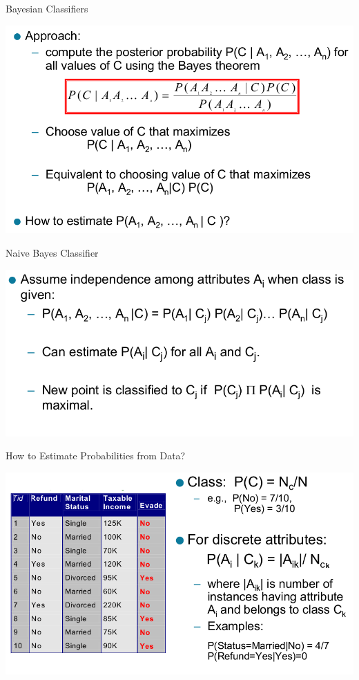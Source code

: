 \documentclass{beamer}
\begin{document}
\begin{frame}{Bayesian Classifiers}
    \begin{center}
        \includegraphics[scale=0.4]{bayesClassifier4.png}
    \end{center}
\end{frame}
\begin{frame}{Naive Bayes Classifier}
    \begin{center}
        \includegraphics[scale=0.4]{bayesClassifier5.png}
    \end{center}
\end{frame}
\begin{frame}{How to Estimate Probabilities from Data?}
    \begin{center}
        \includegraphics[scale=0.4]{bayesClassifier6.png}
    \end{center}
\end{frame}
\end{document}
